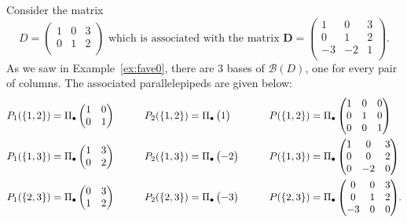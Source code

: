 \documentclass[ALCO,ThmDefs,Unicode,epreuves]{cedram}
\newcommand{\D}{\mathbf{D}}
\newcommand*{\Mk}{\mkern -2mu}
\begin{document}
\begin{exam}\label{ex:favorite}
Consider the matrix 
\[
D = \begin{pmatrix}
1 & 0 & 3 \\
0 & 1 & 2\\
\end{pmatrix}
\text{ which is associated with the matrix }
\D = \begin{pmatrix}
1 & 0 & 3 \\
0 & 1 & 2\\
-3&-2 & 1\\
\end{pmatrix}.
\]
As we saw in Example~\ref{ex:fave0}, there are 3 bases of $\mathcal B(D)$, one for every pair of columns. The associated parallelepipeds are given below:
\[
\begin{aligned}
P_1(\{1,2\}) &= \Pi_\bullet\begin{pmatrix}
1 & 0 \\
0 & 1 \\
\end{pmatrix} &\qquad
P_2(\{1,2\}) &= \Pi_\bullet\begin{pmatrix}
1 \\
\end{pmatrix}&\qquad
P(\{1,2\}) &= \Pi_\bullet\begin{pmatrix}
1 & 0 & 0\\
0 & 1 & 0\\
0 & 0 & 1\\
\end{pmatrix}
\\
P_1(\{1,3\}) &= \Pi_\bullet\begin{pmatrix}
1 & 3 \\
0 & 2 \\
\end{pmatrix}&\qquad
P_2(\{1,3\}) &= \Pi_\bullet\begin{pmatrix}
-2 \\
\end{pmatrix}&\qquad
P(\{1,3\}) &= \Pi_\bullet\begin{pmatrix}
1 & 0 & 3\\
0 & 0 & 2\\
0 & -2 & 0\\
\end{pmatrix}
\\
P_1(\{2,3\}) &= \Pi_\bullet\begin{pmatrix}
0 & 3 \\
1 & 2 \\
\end{pmatrix}&\qquad
P_2(\{2,3\}) &= \Pi_\bullet\begin{pmatrix}
-3 \\
\end{pmatrix}&\qquad
P(\{2,3\}) &= \Pi_\bullet\begin{pmatrix}
0 & 0 & 3\\
0 & 1 & 2\\
-3& 0 & 0\\
\end{pmatrix}\Mk\Mk.
\end{aligned}
\]



\end{exam}
\end{document}
